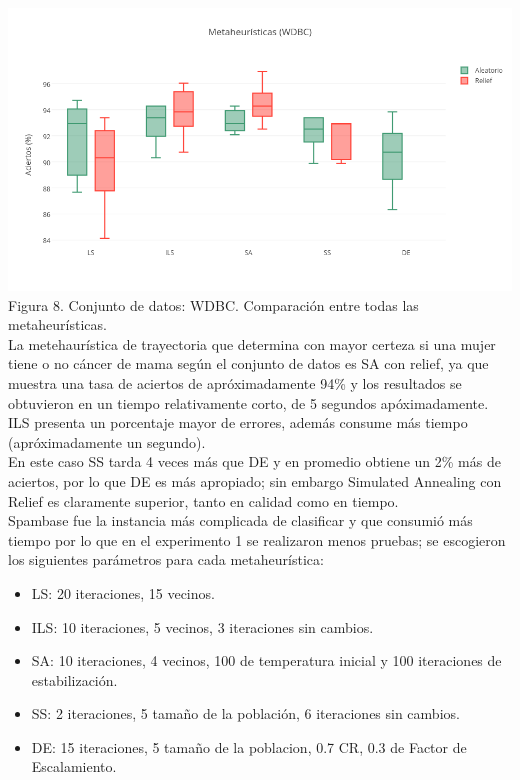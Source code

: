 \documentclass{ci5652}
\begin{document}
\includegraphics[width=\columnwidth]{metaheuristicas_WDBC}
{\small Figura 8. Conjunto de datos: WDBC. Comparación entre todas las
metaheurísticas.}\\

La metehaurística de trayectoria que determina con mayor certeza si una mujer
tiene o no cáncer de mama según el conjunto de datos es SA con relief, ya que
muestra una tasa de aciertos de apróximadamente 94\% y los resultados se
obtuvieron en un tiempo relativamente corto, de 5 segundos apóximadamente. ILS
presenta un porcentaje mayor de errores, además consume más tiempo
(apróximadamente un segundo).\\

En este caso SS tarda 4 veces más que DE y en promedio obtiene un 2\% más de
aciertos, por lo que DE es más apropiado; sin embargo Simulated Annealing con
Relief es claramente superior, tanto en calidad como en tiempo.\\

Spambase fue la instancia más complicada de clasificar y que consumió más tiempo
por lo que en el experimento 1 se realizaron menos pruebas; se escogieron los
siguientes parámetros para cada metaheurística:

\begin{itemize}
  \item LS: 20 iteraciones, 15 vecinos.
  \item ILS: 10 iteraciones, 5 vecinos, 3 iteraciones sin cambios.
  \item SA: 10 iteraciones, 4 vecinos, 100 de temperatura inicial y 100
  iteraciones de estabilización.
  \item SS: 2 iteraciones, 5 tamaño de la población, 6 iteraciones sin cambios.
  \item DE: 15 iteraciones, 5 tamaño de la poblacion, 0.7 CR, 0.3 de Factor de
  Escalamiento.
\end{itemize}
\end{document}
